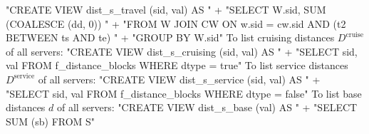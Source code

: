 "CREATE VIEW dist_s_travel (sid, val) AS "
  + "SELECT W.sid, SUM (COALESCE (dd, 0)) "
  + "FROM W JOIN CW ON w.sid = cw.sid AND (t2 BETWEEN ts AND te) "
  + "GROUP BY W.sid"
\nwendcode{}\nwdocspar
To list cruising distances $D^\textrm{cruise}$ of all servers:
\nwenddocs{}\endmoddef{}
"CREATE VIEW dist_s_cruising (sid, val) AS "
  + "SELECT sid, val FROM f_distance_blocks WHERE dtype = true"
\nwendcode{}\nwdocspar
To list service distances $D^\textrm{service}$ of all servers:
\nwenddocs{}\endmoddef{}
"CREATE VIEW dist_s_service (sid, val) AS "
  + "SELECT sid, val FROM f_distance_blocks WHERE dtype = false"
\nwendcode{}\nwdocspar
To list base distances $d$ of all servers:
\nwenddocs{}\endmoddef{}
"CREATE VIEW dist_s_base (val) AS "
  + "SELECT SUM (sb) FROM S"
\nwendcode{}

